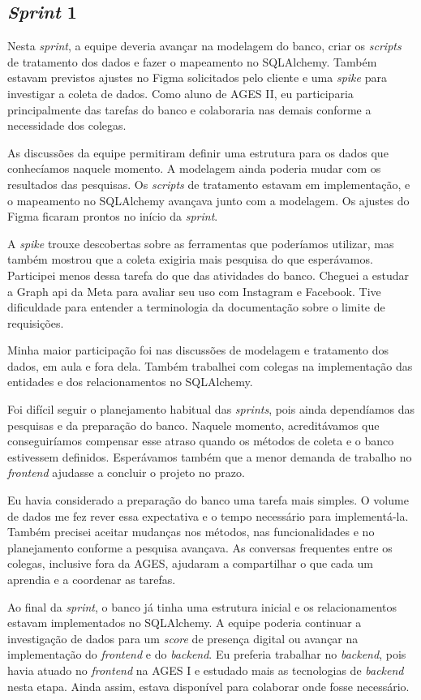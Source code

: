 \subsection{\textit{Sprint} 1}

Nesta \textit{sprint}, a equipe deveria avançar na modelagem do banco, criar
os \textit{scripts} de tratamento dos dados e fazer o mapeamento no SQLAlchemy.
Também estavam previstos ajustes no Figma solicitados pelo cliente e uma
\textit{spike} para investigar a coleta de dados. Como aluno de AGES II, eu
participaria principalmente das tarefas do banco e colaboraria nas demais
conforme a necessidade dos colegas.

As discussões da equipe permitiram definir uma estrutura para os dados que
conhecíamos naquele momento. A modelagem ainda poderia mudar com os resultados
das pesquisas. Os \textit{scripts} de tratamento estavam em implementação, e o
mapeamento no SQLAlchemy avançava junto com a modelagem. Os ajustes do Figma
ficaram prontos no início da \textit{sprint}.

A \textit{spike} trouxe descobertas sobre as ferramentas que poderíamos utilizar,
mas também mostrou que a coleta exigiria mais pesquisa do que esperávamos.
Participei menos dessa tarefa do que das atividades do banco. Cheguei a estudar
a Graph \ac{api} da Meta \cite{meta-graph-api} para avaliar seu uso com Instagram
e Facebook. Tive dificuldade para entender a terminologia da documentação sobre
o limite de requisições.

Minha maior participação foi nas discussões de modelagem e tratamento dos dados,
em aula e fora dela. Também trabalhei com colegas na implementação das entidades
e dos relacionamentos no SQLAlchemy.

Foi difícil seguir o planejamento habitual das \textit{sprints}, pois ainda
dependíamos das pesquisas e da preparação do banco. Naquele momento, acreditávamos
que conseguiríamos compensar esse atraso quando os métodos de coleta e o banco
estivessem definidos. Esperávamos também que a menor demanda de trabalho no
\textit{frontend} ajudasse a concluir o projeto no prazo.

Eu havia considerado a preparação do banco uma tarefa mais simples. O volume
de dados me fez rever essa expectativa e o tempo necessário para implementá-la.
Também precisei aceitar mudanças nos métodos, nas funcionalidades e no
planejamento conforme a pesquisa avançava. As conversas frequentes entre os
colegas, inclusive fora da AGES, ajudaram a compartilhar o que cada um aprendia
e a coordenar as tarefas.

Ao final da \textit{sprint}, o banco já tinha uma estrutura inicial e os
relacionamentos estavam implementados no SQLAlchemy. A equipe poderia continuar
a investigação de dados para um \textit{score} de presença digital ou avançar na
implementação do \textit{frontend} e do \textit{backend}. Eu preferia trabalhar
no \textit{backend}, pois havia atuado no \textit{frontend} na AGES I e estudado
mais as tecnologias de \textit{backend} nesta etapa. Ainda assim, estava
disponível para colaborar onde fosse necessário.
